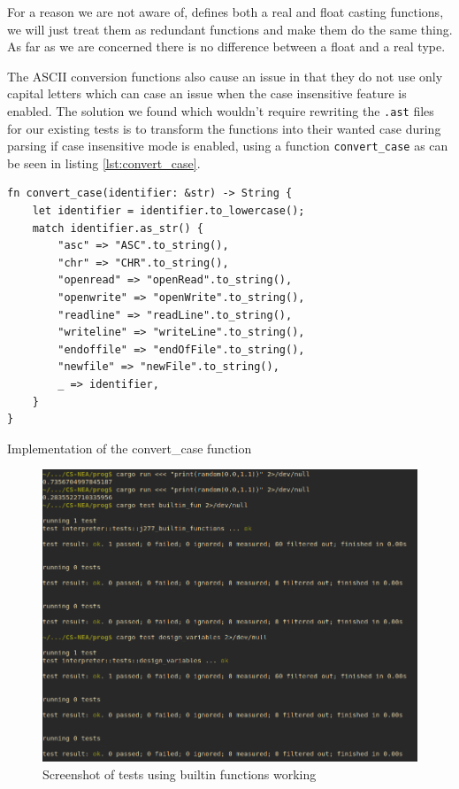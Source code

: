 \documentclass{article}
\begin{document}
For a reason we are not aware of,  defines both a real and
float casting functions, we will just treat them as redundant functions and
make them do the same thing. As far as we are concerned there is no difference
between a float and a real type.

The ASCII conversion functions also cause an issue in that they do not use only
capital letters which can case an issue when the case insensitive feature is
enabled. The solution we found which wouldn't require rewriting the
\texttt{.ast} files for our existing tests is to transform the functions into
their wanted case during parsing if case insensitive mode is enabled, using a
function \texttt{convert\_case} as can be seen in listing
\ref{lst:convert_case}.

\begin{listing}
	\begin{verbatim}
fn convert_case(identifier: &str) -> String {
    let identifier = identifier.to_lowercase();
    match identifier.as_str() {
        "asc" => "ASC".to_string(),
        "chr" => "CHR".to_string(),
        "openread" => "openRead".to_string(),
        "openwrite" => "openWrite".to_string(),
        "readline" => "readLine".to_string(),
        "writeline" => "writeLine".to_string(),
        "endoffile" => "endOfFile".to_string(),
        "newfile" => "newFile".to_string(),
        _ => identifier,
    }
}
	\end{verbatim}
	\caption[Implementation of the convert\_case function]{Implementation of
	the convert\_case function}
	\label{lst:convert_case}
\end{listing}

\begin{figure}
	\includegraphics[width=\textwidth]{builtin_functions}
	\caption{Screenshot of tests using builtin functions working}
	\label{fig:builtin_functions}
\end{figure}
\end{document}
